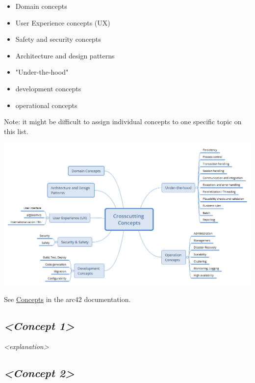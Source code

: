\documentclass[
]{article}
\begin{document}
\begin{itemize}
\item
  Domain concepts
\item
  User Experience concepts (UX)
\item
  Safety and security concepts
\item
  Architecture and design patterns
\item
  "Under-the-hood"
\item
  development concepts
\item
  operational concepts
\end{itemize}

Note: it might be difficult to assign individual concepts to one
specific topic on this list.

\includegraphics{images/08-Crosscutting-Concepts-Structure-EN.png}

See \href{https://docs.arc42.org/section-8/}{Concepts} in the arc42
documentation.

\hypertarget{__emphasis_concept_1_emphasis}{%
\subsection{\texorpdfstring{\emph{\textless Concept
1\textgreater{}}}{\textless Concept 1\textgreater{}}}\label{__emphasis_concept_1_emphasis}}

\emph{\textless explanation\textgreater{}}

\hypertarget{__emphasis_concept_2_emphasis}{%
\subsection{\texorpdfstring{\emph{\textless Concept
2\textgreater{}}}{\textless Concept 2\textgreater{}}}\label{__emphasis_concept_2_emphasis}}
\end{document}
